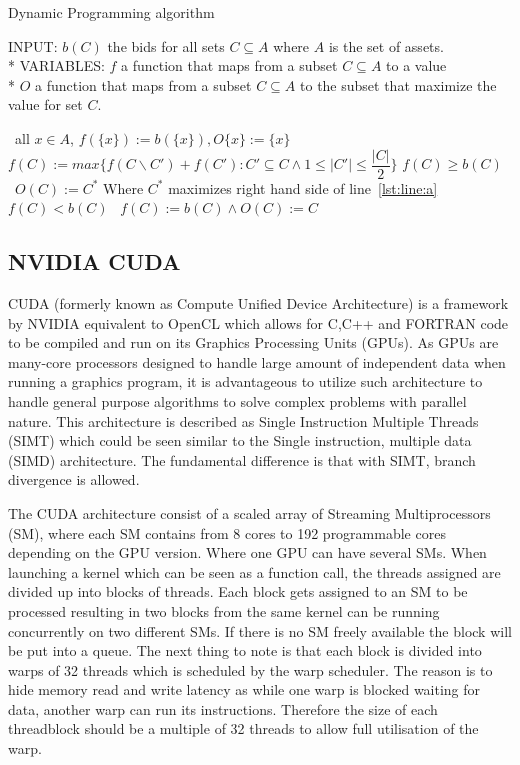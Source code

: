 \documentclass[a4paper, 12pt]{report}
\begin{document}
\begin{algorithm}
\caption{Dynamic Programming algorithm \label{DP}}
INPUT: $b(C)$ the bids for all sets $C \subseteq A$ where $A$ is the set of assets.\\*
VARIABLES: $f$ a function that maps from a subset $C \subseteq A$ to a value\\*
$O$ a function that maps from a subset $C \subseteq A$ to the subset that maximize the value for set $C$.
\begin{algorithmic}[1]
\STATE\algorithmicfor\ all $x \in A$, \algorithmicdo $f(\{x\}):= b(\{x\}),O\{x\}:= \{x\}$ \algorithmicendfor
{}
\STATE $f(C) := max\{f(C\backslash C')+f(C'):C'\subseteq C \wedge 1 \leq \vert C' \vert \leq \dfrac{\vert C \vert}{2}\}$ \label{lst:line:a}
\STATE\algorithmicif $f(C) \geq b(C)$ \algorithmicthen\ $O(C) := C^{*}$ \hfill Where $C^{*}$ maximizes right hand side of line~\ref{lst:line:a} \algorithmicendif
\STATE\algorithmicif $f(C) < b(C)$ \algorithmicthen\ $f(C) := b(C)\wedge O(C) := C$ \algorithmicendif
\ENDFOR
\ENDFOR
\end{algorithmic}
\end{algorithm}

\subsection{NVIDIA CUDA}
CUDA (formerly known as Compute Unified Device Architecture) is a framework by NVIDIA equivalent to OpenCL 
which allows for C,C++ and FORTRAN code to be compiled and run on its Graphics Processing Units (GPUs).
As GPUs are many-core processors designed to handle large amount of independent data when running a graphics program, 
it is advantageous to utilize such architecture to handle general purpose algorithms to solve complex problems with parallel nature.
This architecture is described as Single Instruction Multiple Threads (SIMT) which could be seen similar to the Single instruction, 
multiple data (SIMD) architecture.
The fundamental difference is that with SIMT, branch divergence is allowed.

The CUDA architecture consist of a scaled array of Streaming Multiprocessors (SM), 
where each SM contains from 8 cores to 192 programmable cores depending on the GPU version.
Where one GPU can have several SMs.
When launching a kernel which can be seen as a function call, the threads assigned are divided up into blocks of threads.
Each block gets assigned to an SM to be processed resulting in two blocks from the same kernel can be running concurrently on two different SMs.
If there is no SM freely available the block will be put into a queue.
The next thing to note is that each block is divided into warps of 32 threads which is scheduled by the warp scheduler.
The reason is to hide memory read and write latency as while one warp is blocked waiting for data, another warp can run its instructions.
Therefore the size of each threadblock should be a multiple of 32 threads to allow full utilisation of the warp.
\end{document}
